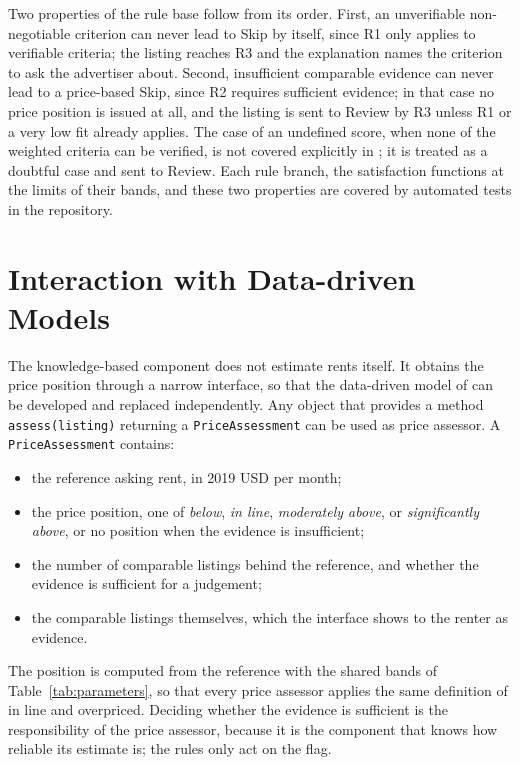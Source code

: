 \documentclass[12pt,a4paper]{report}
\begin{document}
Two properties of the rule base follow from its order. First, an
unverifiable non-negotiable criterion can never lead to Skip by itself,
since R1 only applies to verifiable criteria; the listing reaches R3 and
the explanation names the criterion to ask the advertiser about. Second,
insufficient comparable evidence can never lead to a price-based Skip,
since R2 requires sufficient evidence; in that case no price position is
issued at all, and the listing is sent to Review by R3 unless R1 or a very
low fit already applies. The case of an undefined score, when none of the
weighted criteria can be verified, is not covered explicitly in
; it is treated as a doubtful case and sent to Review.
Each rule branch, the satisfaction functions at the limits of their bands,
and these two properties are covered by automated tests in the repository.

\section{Interaction with Data-driven Models}

The knowledge-based component does not estimate rents itself. It obtains
the price position through a narrow interface, so that the data-driven
model of  can be developed and replaced independently.
Any object that provides a method \texttt{assess(listing)} returning a
\texttt{PriceAssessment} can be used as price assessor. A
\texttt{PriceAssessment} contains:

\begin{itemize}[leftmargin=*]
  \item the reference asking rent, in 2019 USD per month;
  \item the price position, one of \emph{below}, \emph{in line},
  \emph{moderately above}, or \emph{significantly above}, or no position
  when the evidence is insufficient;
  \item the number of comparable listings behind the reference, and
  whether the evidence is sufficient for a judgement;
  \item the comparable listings themselves, which the interface shows to
  the renter as evidence.
\end{itemize}

The position is computed from the reference with the shared bands of
Table~\ref{tab:parameters}, so that every price assessor applies the same
definition of in line and overpriced. Deciding whether the evidence is
sufficient is the responsibility of the price assessor, because it is the
component that knows how reliable its estimate is; the rules only act on
the flag.
\end{document}
